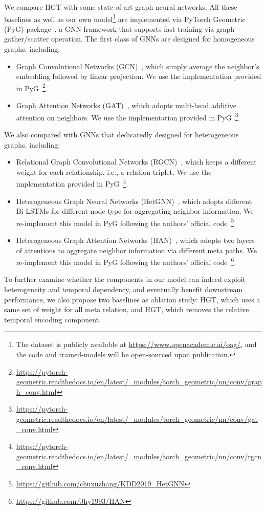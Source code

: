 \documentclass[sigconf]{acmart}
\theoremstyle{definition}
\begin{document}
{We compare HGT with some state-of-art graph neural networks. All these baselines as well as our own model\footnote{The dataset is publicly available at \url{https://www.openacademic.ai/oag/}, and the code and trained-models will be open-sourced upon publication.} are implemented via PyTorch Geometric (PyG) package~\cite{pyG}, a GNN framework that supports fast training via graph gather/scatter operation. The first class of GNNs are designed for homogeneous graphs, including:
\begin{itemize}
    \item Graph Convolutional Networks (GCN)~\cite{gcn}, which simply average the neighbor's embedding followed by linear projection. We use the implementation provided in PyG~\footnote{\url{https://pytorch-geometric.readthedocs.io/en/latest/_modules/torch_geometric/nn/conv/graph_conv.html}}.
    \item Graph Attention Networks (GAT)~\cite{gat}, which adopts multi-head additive attention on neighbors. We use the implementation provided in PyG~\footnote{\url{https://pytorch-geometric.readthedocs.io/en/latest/_modules/torch_geometric/nn/conv/gat_conv.html}}. 
\end{itemize}
We also compared with GNNs that dedicatedly designed for heterogeneous graphs, including:
\begin{itemize}
    \item Relational Graph Convolutional Networks (RGCN)~\cite{DBLP:conf/esws/SchlichtkrullKB18}, which keeps a different weight for each relationship, i.e., a relation triplet. We use the implementation provided in PyG~\footnote{\url{https://pytorch-geometric.readthedocs.io/en/latest/_modules/torch_geometric/nn/conv/rgcn_conv.html}}.
    \item Heterogeneous Graph Neural Networks (HetGNN)~\cite{DBLP:conf/kdd/ZhangSHSC19}, which adopts different Bi-LSTMs for different node type for aggregating neighbor information. We re-implement this model in PyG following the authors' official code~\footnote{\url{https://github.com/chuxuzhang/KDD2019_HetGNN}}.
    \item Heterogeneous Graph Attention Networks (HAN)~\cite{DBLP:conf/www/WangJSWYCY19}, which adopts two layers of attentions to aggregate neighbor information via different meta paths. We re-implement this model in PyG following the authors' official code~\footnote{\url{https://github.com/Jhy1993/HAN}}.
\end{itemize}

To further examine whether the components in our model can indeed exploit heterogeneity and temporal dependency, and eventually benefit downstream performance, we also propose two baselines as ablation study:  HGT, which uses a same set of weight for all meta relation, and HGT, which removes the relative temporal encoding component. 

}
\end{document}
